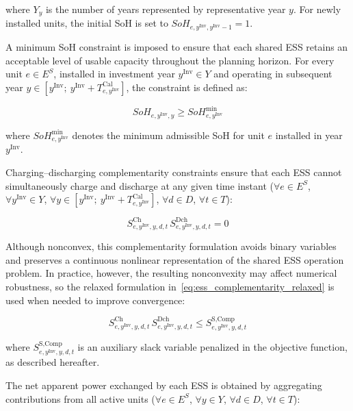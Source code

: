 \documentclass[preprint,12pt]{elsarticle}
\begin{document}
\noindent
where $Y_y$ is the number of years represented by representative year $y$. 
For newly installed units, the initial SoH is set to $SoH_{e,y^\text{Inv},y^\text{Inv}-1}=1$.

A minimum SoH constraint is imposed to ensure that each shared ESS retains an acceptable level of usable capacity throughout the planning horizon. For every unit $e \in E^S$, installed in investment year $y^\text{Inv} \in Y$ and operating in subsequent year $y \in [y^\text{Inv};~y^\text{Inv} + T^\text{Cal}_{e,y^\text{Inv}}]$, the constraint is defined as:

\begin{equation}
    SoH_{e,y^\text{Inv},y} \geq SoH_{e,y^\text{Inv}}^{\text{min}}
\end{equation}

\noindent
where $SoH_{e,y^\text{Inv}}^{\text{min}}$ denotes the minimum admissible SoH for unit $e$ installed in year $y^\text{Inv}$.

Charging--discharging complementarity constraints ensure that each ESS cannot simultaneously charge and discharge at any given time instant ($\forall e \in E^S$, $\forall y^\text{Inv} \in Y$, $\forall y \in [y^\text{Inv};~y^\text{Inv}+T^\text{Cal}_{e,y^\text{Inv}}]$, $\forall d \in D$, $\forall t \in T$):

\begin{equation}
    S^\text{Ch}_{e,y^\text{Inv},y,d,t} \, S^\text{Dch}_{e,y^\text{Inv},y,d,t} = 0
    \label{eq:ess_complementarity}
\end{equation}

Although nonconvex, this complementarity formulation avoids binary variables and preserves a continuous nonlinear representation of the shared ESS operation problem. In practice, however, the resulting nonconvexity may affect numerical robustness, so the relaxed formulation in~\eqref{eq:ess_complementarity_relaxed} is used when needed to improve convergence:

\begin{equation}
    S^\text{Ch}_{e,y^\text{Inv},y,d,t} \, S^\text{Dch}_{e,y^\text{Inv},y,d,t} \leq S^\text{S,Comp}_{e,y^\text{Inv},y,d,t}
    \label{eq:ess_complementarity_relaxed}
\end{equation}

\noindent
where $S^\text{S,Comp}_{e,y^\text{Inv},y,d,t}$ is an auxiliary slack variable penalized in the objective function, as described hereafter.

The net apparent power exchanged by each ESS is obtained by aggregating contributions from all active units ($\forall e \in E^S$, $\forall y \in Y$, $\forall d \in D$, $\forall t \in T$): 
\end{document}
